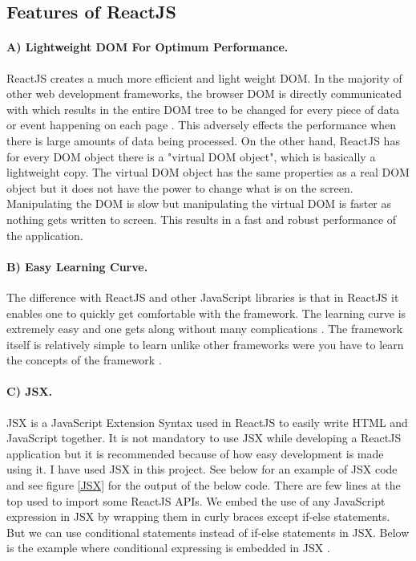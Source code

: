 \subsection{Features of ReactJS}
\paragraph{A) Lightweight DOM For Optimum Performance.}
ReactJS creates a much more efficient and light weight DOM. In the majority of other web development frameworks, the browser DOM is directly communicated with which results in the entire DOM tree to be changed for every piece of data or event happening on each page \cite{aggarwal2018modern}. This adversely effects the performance when there is large amounts of data being processed. 
On the other hand, ReactJS has for every DOM object there is a "virtual DOM object", which is basically a lightweight copy. The virtual DOM object has the same properties as a real DOM object but it does not have the power to change what is on the screen. Manipulating the DOM is slow but manipulating the virtual DOM is faster as nothing gets written to screen. This results in a fast and robust performance of the application.

\paragraph{B) Easy Learning Curve.}
The difference with ReactJS and other JavaScript libraries is that in ReactJS it enables one to quickly get comfortable with the framework. The learning curve is extremely easy and one gets along without many complications \cite{aggarwal2018modern}. The framework itself is relatively simple to learn unlike other frameworks were you have to learn the concepts of the framework \cite{aggarwal2018modern, islam2017reactjs}. 

\paragraph{C) JSX.}
JSX is a JavaScript Extension Syntax used in ReactJS to easily write HTML and JavaScript together. It is not mandatory to use JSX while developing a ReactJS application but it is recommended because of how easy development is made using it. I have used JSX in this project. See below for an example of JSX code and see figure \ref{JSX} for the output of the below code. There are few lines at the top used to import some ReactJS APIs. We embed the use of any JavaScript expression in JSX by wrapping them in curly braces except if-else statements. But we can use conditional statements instead of if-else statements in JSX. Below is the example where conditional expressing is embedded in JSX \cite{JSX}.

